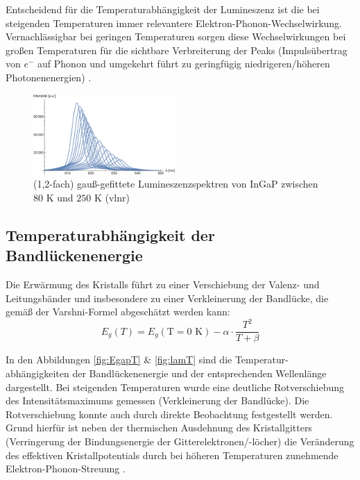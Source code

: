 \documentclass[aps,twocolumn,secnumarabic,nobalancelastpage,amsmath,amssymb,
nofootinbib,superscriptaddress]{revtex4-1}
\begin{document}
Entscheidend für die Temperaturabhängigkeit der Lumineszenz ist die bei steigenden Temperaturen immer
relevantere Elektron-Phonon-Wechselwirkung. Vernachlässigbar bei geringen Temperaturen sorgen diese Wechselwirkungen
bei großen Temperaturen für die sichtbare Verbreiterung der Peaks (Impulsübertrag von $e^-$ auf Phonon und umgekehrt führt
zu geringfügig niedrigeren/höheren Photonenenergien) \cite{phonons}.

\begin{figure}[t]
  \centering
  \includegraphics[width=0.48\textwidth]{../Messung/allfitsplot.eps}
  \caption{\label{fig:spek} (1,2-fach) gauß-gefittete Lumineszenzspektren von InGaP zwischen $80\text{ K}$ und $250\text{ K}$ (vlnr)}
\end{figure}

\subsection{Temperaturabhängigkeit der Bandlückenenergie}

\noindent Die Erwärmung des Kristalls führt zu einer Verschiebung der Valenz- und Leitungsbänder und insbesondere
zu einer Verkleinerung der Bandlücke, die gemäß der Varshni-Formel abgeschätzt werden kann:
\begin{equation}
  E_g(T) = E_g(\text{T}=0\text{ K})-\alpha\cdot\frac{T^2}{T+\beta}
   \label{eq:varshni}
\end{equation}

\noindent In den Abbildungen \ref{fig:EgapT} \& \ref{fig:lamT} sind die Temperatur-
abhängigkeiten der Bandlückenenergie und der entsprechenden Wellenlänge dargestellt. Bei steigenden Temperaturen wurde eine deutliche
Rotverschiebung des Intensitätsmaximums gemessen (Verkleinerung der Bandlücke). Die Rotverschiebung konnte auch durch
direkte Beobachtung festgestellt werden. Grund hierfür ist neben der thermischen Ausdehnung des Kristallgitters (Verringerung
der Bindungsenergie der Gitterelektronen/-löcher) die Veränderung des effektiven Kristallpotentials durch bei höheren Temperaturen
zunehmende Elektron-Phonon-Streuung \cite{kittel}.
\end{document}
